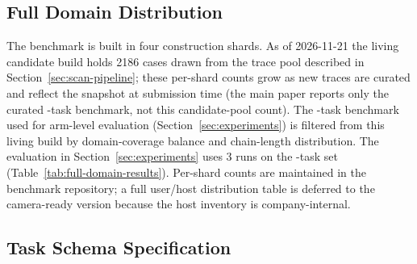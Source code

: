 \subsection{Full Domain Distribution}
\label{sec:full-distribution}

The benchmark is built in four construction shards. As of 2026-11-21 the living
candidate build holds 2186 cases drawn from the
trace pool described in Section~\ref{sec:scan-pipeline}; these per-shard counts
grow as new traces are curated and reflect the snapshot at submission time (the
main paper reports only the curated \Ncases{}-task benchmark, not this candidate-pool
count). The \Ncases{}-task benchmark used for arm-level evaluation
(Section~\ref{sec:experiments}) is filtered from this living build by
domain-coverage balance and chain-length distribution. The evaluation in
Section~\ref{sec:experiments} uses 3 runs on the \Ncases{}-task set
(Table~\ref{tab:full-domain-results}). Per-shard counts are maintained
in the benchmark repository; a full user/host distribution table is deferred to
the camera-ready version because the host inventory is company-internal.

\subsection{Task Schema Specification}
\label{sec:task-schema-spec}

